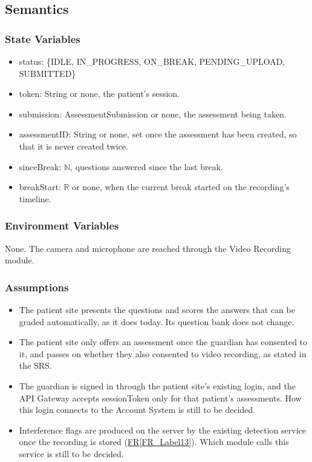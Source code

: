 \documentclass[12pt, titlepage]{article}
\newcommand{\srsref}[2]{\href{https://github.com/Nour-Fawaz/MacaBoca/blob/main/pdfs/SRS/SRS.pdf}{#1\ref*{#2}}}
\begin{document}
\subsection{Semantics}

\subsubsection{State Variables}
\begin{itemize}
\item status: \{IDLE, IN\_PROGRESS, ON\_BREAK, PENDING\_UPLOAD, SUBMITTED\}
\item token: String or none, the patient's session.
\item submission: AssessmentSubmission or none, the assessment being taken.
\item assessmentID: String or none, set once the assessment has been created, so that it is never created twice.
\item sinceBreak: $\mathbb{N}$, questions answered since the last break.
\item breakStart: $\mathbb{R}$ or none, when the current break started on the recording's timeline.
\end{itemize}

\subsubsection{Environment Variables}
None. The camera and microphone are reached through the Video Recording module.

\subsubsection{Assumptions}
\begin{itemize}
\item The patient site presents the questions and scores the answers that can be graded automatically, as it does today. Its question bank does not change.
\item The patient site only offers an assessment once the guardian has consented to it, and passes on whether they also consented to video recording, as stated in the SRS.
\item The guardian is signed in through the patient site's existing login, and the API Gateway accepts sessionToken only for that patient's assessments. How this login connects to the Account System is still to be decided.
\item Interference flags are produced on the server by the existing detection service once the recording is stored (\srsref{FR}{FR_Label13}). Which module calls this service is still to be decided.
\end{itemize}
\end{document}
